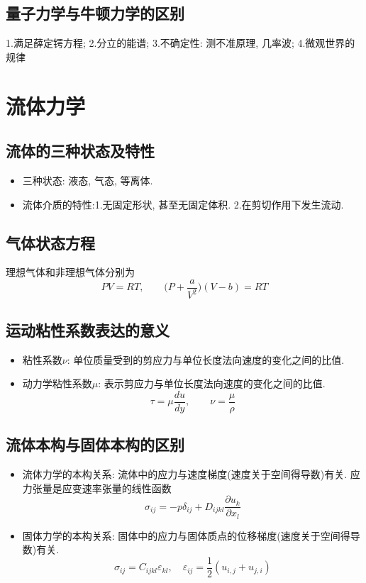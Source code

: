 \documentclass[a4paper,titlepage,twocolumn]{article}
\begin{document}
\subsection{量子力学与牛顿力学的区别}
1.满足薛定锷方程; 2.分立的能谱; 3.不确定性: 测不准原理, 几率波; 4.微观世界的规律

\section{流体力学}

\subsection{流体的三种状态及特性}
\begin{itemize}
\item 三种状态: 液态, 气态, 等离体.
\item 流体介质的特性:1.无固定形状, 甚至无固定体积. 2.在剪切作用下发生流动.
\end{itemize}
 
\subsection{气体状态方程}
理想气体和非理想气体分别为
\[
PV = RT, \qquad
\bigg(P+\frac{a}{V^2}\bigg)(V-b) = RT
\]

\subsection{运动粘性系数表达的意义}
\begin{itemize}
\item 粘性系数$\nu$: 单位质量受到的剪应力与单位长度法向速度的变化之间的比值.
\item 动力学粘性系数$\mu$: 表示剪应力与单位长度法向速度的变化之间的比值.
\[
\tau = \mu\frac{du}{dy}, \qquad
\nu =\frac{\mu}{\rho}
\]
\end{itemize}

\subsection{流体本构与固体本构的区别}
\begin{itemize}
\item 流体力学的本构关系: 流体中的应力与速度梯度(速度关于空间得导数)有关. 应力张量是应变速率张量的线性函数
\[
\sigma_{ij} = -p\delta_{ij} + D_{ijkl}\frac{\partial u_k}{\partial x_l}
\]

\item 固体力学的本构关系: 固体中的应力与固体质点的位移梯度(速度关于空间得导数)有关.
\[
\sigma_{ij} = C_{ijkl}\varepsilon_{kl}, \quad \varepsilon_{ij} = \frac{1}{2}(u_{i,j}+u_{j,i})
\]
\end{itemize}
\end{document}
